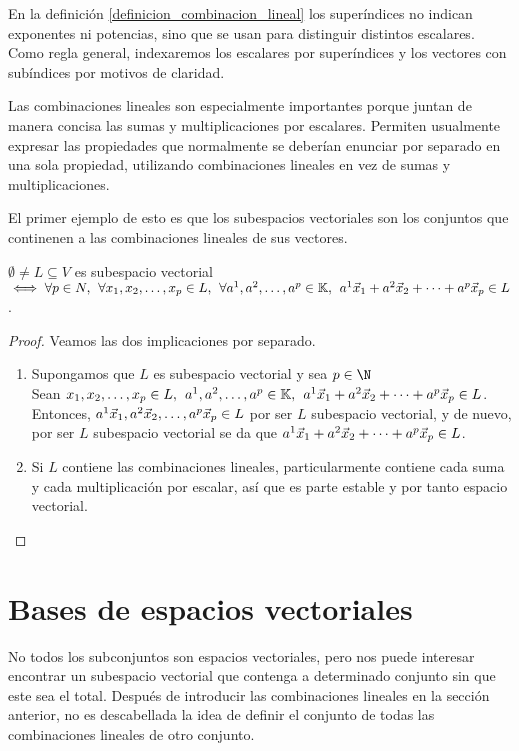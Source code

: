 \documentclass[../algebra_lineal.tex]{subfiles}
\begin{document}
\begin{remark}
    En la definición \ref{definicion_combinacion_lineal} los superíndices no indican exponentes ni potencias, sino que se usan para distinguir distintos escalares. Como regla general, indexaremos los escalares por superíndices y los vectores con subíndices por motivos de claridad.
\end{remark}

Las combinaciones lineales son especialmente importantes porque juntan de manera concisa las sumas y multiplicaciones por escalares. Permiten usualmente expresar las propiedades que normalmente se deberían enunciar por separado en una sola propiedad, utilizando combinaciones lineales en vez de sumas y multiplicaciones. 

El primer ejemplo de esto es que los subespacios vectoriales son los conjuntos que continenen a las combinaciones lineales de sus vectores.


\begin{proposition}
    $\emptyset \ne L \subseteq V$ es subespacio vectorial $\iff \forall p \in N, \hspace{1.5mm} \forall {x}_{1}, {x}_{2}, \dots, {x}_{p} \in L, \hspace{1.5mm} \forall {a}^{1}, {a}^{2}, \dots, {a}^{p} \in \mathbb{K}, \hspace{1.5mm} {a}^{1}\vec{x}_{1}+{a}^{2}\vec{x}_{2}+\dots+{a}^{p}\vec{x}_{p} \in L$.
\end{proposition}

\begin{proof}
    Veamos las dos implicaciones por separado.
    \begin{enumerate}
        \item[\protect\fbox{$\Rightarrow$}] Supongamos que $L$ es subespacio vectorial y sea $p \in \N$ \\
        Sean ${x}_{1}, {x}_{2}, \dots, {x}_{p} \in L, \hspace{1.5mm} {a}^{1}, {a}^{2}, \dots, {a}^{p} \in \mathbb{K}, \hspace{1.5mm} {a}^{1}\vec{x}_{1}+{a}^{2}\vec{x}_{2}+\dots+{a}^{p}\vec{x}_{p} \in L$. Entonces, $a^1 \vec{x}_1, a^2\vec{x}_2, \dots, a^p\vec{x}_p \in L$ por ser $L$ subespacio vectorial, y de nuevo, por ser $L$ subespacio vectorial se da que ${a}^{1}\vec{x}_{1}+{a}^{2}\vec{x}_{2}+\dots+{a}^{p}\vec{x}_{p} \in L$. 
        \item[\protect\fbox{$\Leftarrow$}] Si $L$ contiene las combinaciones lineales, particularmente contiene cada suma y cada multiplicación por escalar, así que es parte estable y por tanto espacio vectorial.
    \end{enumerate} 
\end{proof}

\section{Bases de espacios vectoriales}

No todos los subconjuntos son espacios vectoriales, pero nos puede interesar encontrar un subespacio vectorial que contenga a determinado conjunto sin que este sea el total. Después de introducir las combinaciones lineales en la sección anterior, no es descabellada la idea de definir el conjunto de todas las combinaciones lineales de otro conjunto.
\end{document}
